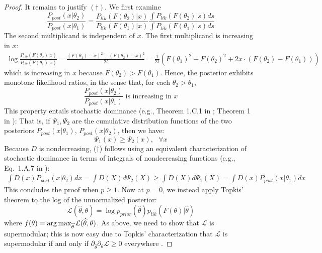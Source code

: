 \begin{proof}
It remains to justify $(\dagger)$.
We first examine
\begin{equation}
    \frac{P_{post}(x|\theta_2)}{P_{post}(x|\theta_1)} = \frac{P_{lik}(F(\theta_2)|x)}{P_{lik}(F(\theta_1)|x)} \frac{\int P_{lik}(F(\theta_2)|s)ds}{\int P_{lik}(F(\theta_1)|s)ds} 
\end{equation}
The second multiplicand is independent of $x$. The first multiplicand is increasing in $x$:
\begin{align*}
   \log \frac{P_{lik}(F(\theta_2)|x)}{P_{lik}(F(\theta_1)|x)} = \frac{(F(\theta_1)-x)^2 - (F(\theta_2)-x)^2}{2t} = \frac{1}{2t} \left(F(\theta_1)^2 - F(\theta_2)^2 + 2x \cdot (F(\theta_2)-F(\theta_1))  \right)
\end{align*}
which is increasing in $x$ because $F(\theta_2) > F(\theta_1)$.
Hence, the posterior exhibits monotone likelihood ratios, in the sense that, for each $\theta_2>\theta_1$,
\begin{equation}
    \frac{P_{post}(x|\theta_2)}{P_{post}(x|\theta_1)}\text{ is increasing in $x$}
\end{equation}
This property  entails stochastic dominance (e.g., Theorem 1.C.1 in \cite{shaked2007stochastic}; Theorem 1 in \cite{lehmann1955ordered}):
That is, if $\Psi_1, \Psi_2$ are the cumulative distribution functions of the two posteriors $P_{post}(x|\theta_1)$, $P_{post}(x|\theta_2)$, then we have:
\begin{equation}
    \Psi_1(x) \geq \Psi_2(x), \ \ \ \forall x
\end{equation}
Because $D$ is nondecreasing, ($\dagger$) follows using an equivalent characterization of stochastic dominance in terms of integrals of nondecreasing functions (e.g., Eq.~1.A.7 in \cite{shaked2007stochastic}):
\begin{align*}
    \int D(x) P_{post}(x|\theta_2) dx = \int D(X) d\Psi_2(X) 
     \geq \int D(X) d\Psi_1(X) = \int D(x) P_{post}(x|\theta_1) dx 
\end{align*}
This concludes the proof when $p\geq 1$.
Now at $p=0$, we instead apply Topkis' theorem to the log of the unnormalized posterior:
\begin{equation}
    \mathcal{L}(\widehat{\theta},\theta) = \log p_{prior}(\widehat{\theta}) p_{lik}(F(\theta)|\widehat{\theta})
\end{equation}
where $f(\theta) = \operatorname*{arg\,max}_{\widehat{\theta}} \mathcal{L}(\widehat{\theta}, \theta)$.
As above, we need to show that $\mathcal{L}$ is supermodular; this is now easy due to Topkis' characterization that $\mathcal{L}$ is supermodular if and only if $\partial_{\widehat{\theta}}\partial_\theta \mathcal{L} \geq 0$ everywhere \citep{topkis1978minimizing, topkis1998supermodularity}.

\end{proof}
